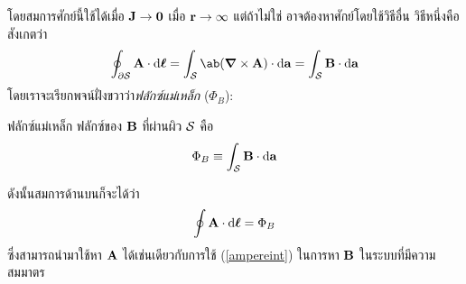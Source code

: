 โดยสมการศักย์นี้ใช้ได้เมื่อ $\mathbf{J}\to\mathbf{0}$ เมื่อ $\mathbf{r}\to\infty$ แต่ถ้าไม่ใช่ อาจต้องหาศักย์โดยใช้วิธีอื่น วิธีหนึ่งคือสังเกตว่า
\[
\oint_{\del\sur} \vb{A}\cdot\odif{\vbs{\ell}} = \int_\sur \ab(\gd\times\vb{A})\cdot\odif{\vb{a}} = \int_\sur\vb{B}\cdot\odif{\vb{a}} 
\]
โดยเราจะเรียกพจน์ฝั่งขวาว่า\emph{ฟลักซ์แม่เหล็ก} ($\Phi_B$):
\begin{defbox}{ฟลักซ์แม่เหล็ก}
    ฟลักซ์ของ $\mathbf{B}$ ที่ผ่านผิว $\mathcal{S}$ คือ
    \begin{equation}
        \Phi_B\equiv\int_\sur\vb{B}\cdot\odif{\vb{a}}
    \end{equation}
\end{defbox}
ดังนั้นสมการด้านบนก็จะได้ว่า
\begin{equation}
    \oint\vb{A}\cdot\odif{\vbs{\ell}} = \Phi_B\label{atofluxb}
\end{equation}
ซึ่งสามารถนำมาใช้หา $\mathbf{A}$ ได้เช่นเดียวกับการใช้ (\ref{ampereint}) ในการหา $\mathbf{B}$ ในระบบที่มีความสมมาตร

